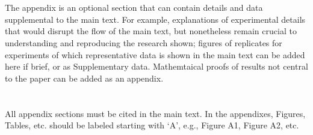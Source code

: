 \documentclass[entropy,article,submit,moreauthors,pdftex,10pt,a4paper]{mdpi}
\begin{document}
\section{}
The appendix is an optional section that can contain details and data supplemental to the main text. For example, explanations of experimental details that would disrupt the flow of the main text, but nonetheless remain crucial to understanding and reproducing the research shown; figures of replicates for experiments of which representative data is shown in the main text can be added here if brief, or as Supplementary data. Mathemtaical proofs of results not central to the paper can be added as an appendix.

\section{}
All appendix sections must be cited in the main text. In the appendixes, Figures, Tables, etc. should be labeled starting with `A', e.g., Figure A1, Figure A2, etc. 







\end{document}
